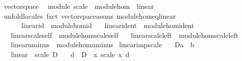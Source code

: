 \begin{isabellebody}
\isanewline
{}\isamarkupfalse%
\ vector{\isacharunderscore}{\kern0pt}space\ \isanewline
\isanewline
{}\isamarkupfalse%
\ module\ scale\ \ {\isachardoublequoteopen}module{\isacharunderscore}{\kern0pt}hom\ {\isacharequal}{\kern0pt}\ linear{\isachardoublequoteclose}\isanewline
%
\isadelimproof
\ \ %
\endisadelimproof
%
\isatagproof
{}\isamarkupfalse%
\ unfold{\isacharunderscore}{\kern0pt}locales\ {\isacharparenleft}{\kern0pt}fact\ vector{\isacharunderscore}{\kern0pt}space{\isacharunderscore}{\kern0pt}assms\ module{\isacharunderscore}{\kern0pt}hom{\isacharunderscore}{\kern0pt}eq{\isacharunderscore}{\kern0pt}linear{\isacharparenright}{\kern0pt}{\isacharplus}{\kern0pt}%
\endisatagproof
{\isafoldproof}%
%
\isadelimproof
\isanewline
%
\endisadelimproof
\isanewline
{}\isamarkupfalse%
%
\isanewline
\ \ \ \ \ \ linear{\isacharunderscore}{\kern0pt}id\ {\isacharequal}{\kern0pt}\ module{\isacharunderscore}{\kern0pt}hom{\isacharunderscore}{\kern0pt}id\isanewline
\ \ \ linear{\isacharunderscore}{\kern0pt}ident\ {\isacharequal}{\kern0pt}\ module{\isacharunderscore}{\kern0pt}hom{\isacharunderscore}{\kern0pt}ident\isanewline
\ \ \ linear{\isacharunderscore}{\kern0pt}scale{\isacharunderscore}{\kern0pt}self\ {\isacharequal}{\kern0pt}\ module{\isacharunderscore}{\kern0pt}hom{\isacharunderscore}{\kern0pt}scale{\isacharunderscore}{\kern0pt}self\isanewline
\ \ \ linear{\isacharunderscore}{\kern0pt}scale{\isacharunderscore}{\kern0pt}left\ {\isacharequal}{\kern0pt}\ module{\isacharunderscore}{\kern0pt}hom{\isacharunderscore}{\kern0pt}scale{\isacharunderscore}{\kern0pt}left\isanewline
\ \ \ linear{\isacharunderscore}{\kern0pt}uminus\ {\isacharequal}{\kern0pt}\ module{\isacharunderscore}{\kern0pt}hom{\isacharunderscore}{\kern0pt}uminus\isanewline
\isanewline
{}\isamarkupfalse%
\ linear{\isacharunderscore}{\kern0pt}imp{\isacharunderscore}{\kern0pt}scale{\isacharcolon}{\kern0pt}\isanewline
\ \ \ D{\isacharcolon}{\kern0pt}{\isacharcolon}{\kern0pt}{\isachardoublequoteopen}{\isacharprime}{\kern0pt}a\ {\isasymRightarrow}\ {\isacharprime}{\kern0pt}b{\isachardoublequoteclose}\isanewline
\ \ \ {\isachardoublequoteopen}linear\ {\isacharparenleft}{\kern0pt}{\isacharasterisk}{\kern0pt}{\isacharparenright}{\kern0pt}\ scale\ D{\isachardoublequoteclose}\isanewline
\ \ \ d\ \ {\isachardoublequoteopen}D\ {\isacharequal}{\kern0pt}\ {\isacharparenleft}{\kern0pt}{\isasymlambda}x{\isachardot}{\kern0pt}\ scale\ x\ d{\isacharparenright}{\kern0pt}{\isachardoublequoteclose}\isanewline

\end{isabellebody}
